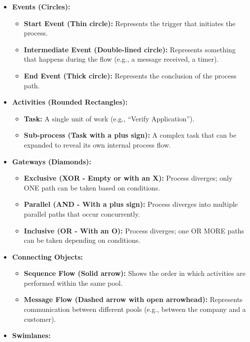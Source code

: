 \begin{itemize}
\tightlist
\item
  \textbf{Events (Circles):}

  \begin{itemize}
  \tightlist
  \item
    \textbf{Start Event (Thin circle):} Represents the trigger that
    initiates the process.
  \item
    \textbf{Intermediate Event (Double-lined circle):} Represents
    something that happens during the flow (e.g., a message received, a
    timer).
  \item
    \textbf{End Event (Thick circle):} Represents the conclusion of the
    process path.
  \end{itemize}
\item
  \textbf{Activities (Rounded Rectangles):}

  \begin{itemize}
  \tightlist
  \item
    \textbf{Task:} A single unit of work (e.g., ``Verify Application'').
  \item
    \textbf{Sub-process (Task with a plus sign):} A complex task that
    can be expanded to reveal its own internal process flow.
  \end{itemize}
\item
  \textbf{Gateways (Diamonds):}

  \begin{itemize}
  \tightlist
  \item
    \textbf{Exclusive (XOR - Empty or with an X):} Process diverges;
    only ONE path can be taken based on conditions.
  \item
    \textbf{Parallel (AND - With a plus sign):} Process diverges into
    multiple parallel paths that occur concurrently.
  \item
    \textbf{Inclusive (OR - With an O):} Process diverges; one OR MORE
    paths can be taken depending on conditions.
  \end{itemize}
\item
  \textbf{Connecting Objects:}

  \begin{itemize}
  \tightlist
  \item
    \textbf{Sequence Flow (Solid arrow):} Shows the order in which
    activities are performed within the same pool.
  \item
    \textbf{Message Flow (Dashed arrow with open arrowhead):} Represents
    communication between different pools (e.g., between the company and
    a customer).
  \end{itemize}
\item
  \textbf{Swimlanes:}


\end{itemize}

